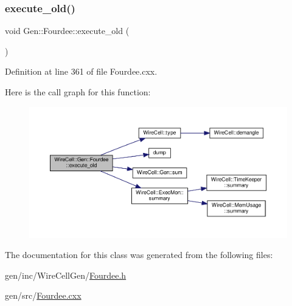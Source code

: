 \subsubsection{\texorpdfstring{execute\+\_\+old()}{execute\_old()}}
{\footnotesize\ttfamily void Gen\+::\+Fourdee\+::execute\+\_\+old (\begin{DoxyParamCaption}{ }\end{DoxyParamCaption})\hspace{0.3cm}{\ttfamily [virtual]}}



Definition at line 361 of file Fourdee.\+cxx.

Here is the call graph for this function\+:
\nopagebreak
\begin{figure}[H]
\begin{center}
\leavevmode
\includegraphics[width=350pt]{class_wire_cell_1_1_gen_1_1_fourdee_a2a79017c41d76c2cd942ba1c87eb3106_cgraph}
\end{center}
\end{figure}


The documentation for this class was generated from the following files\+:\begin{DoxyCompactItemize}
\item 
gen/inc/\+Wire\+Cell\+Gen/\hyperlink{_fourdee_8h}{Fourdee.\+h}\item 
gen/src/\hyperlink{_fourdee_8cxx}{Fourdee.\+cxx}\end{DoxyCompactItemize}

